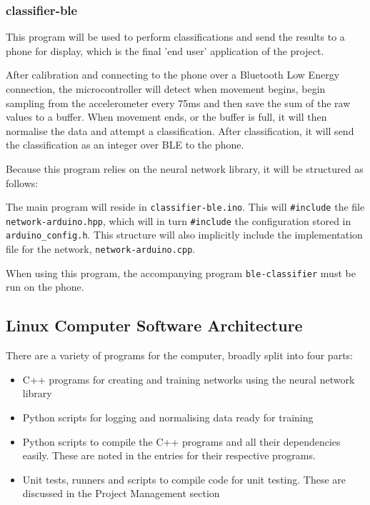 \documentclass[a4paper]{article}
\begin{document}
\subsubsection{classifier-ble}

This program will be used to perform classifications and send the results to a phone for display, which is the final 'end user' application of the project.

After calibration and connecting to the phone over a Bluetooth Low Energy connection, the microcontroller will detect when movement begins, begin sampling from the accelerometer every 75ms and then save the sum of the raw values to a buffer. When movement ends, or the buffer is full, it will then normalise the data and attempt a classification. After classification, it will send the classification as an integer over BLE to the phone.

Because this program relies on the neural network library, it will be structured as follows:

The main program will reside in \lstinline{classifier-ble.ino}. This will \lstinline{#include} the file \lstinline{network-arduino.hpp}, which will in turn \lstinline{#include} the configuration stored in \lstinline{arduino_config.h}. 
This structure will also implicitly include the implementation file for the network, \lstinline{network-arduino.cpp}.


When using this program, the accompanying program \lstinline{ble-classifier} must be run on the phone. 

\subsection{Linux Computer Software Architecture}%

There are a variety of programs for the computer, broadly split into four parts:

\begin{itemize}
\item C++ programs for creating and training networks using the neural network library
\item Python scripts for logging and normalising data ready for training
\item Python scripts to compile the C++ programs and all their dependencies easily. These are noted in the entries for their respective programs.
\item Unit tests, runners and scripts to compile code for unit testing. These are discussed in the Project Management section 
\end{itemize}
\end{document}
